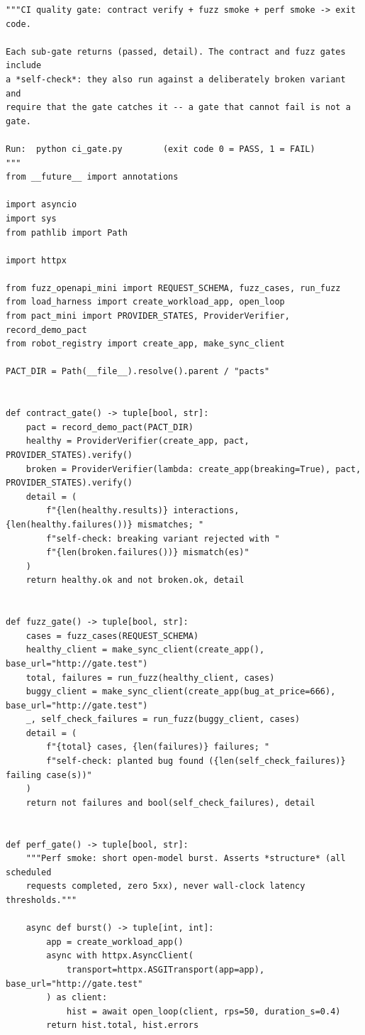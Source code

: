 \begin{verbatim}
"""CI quality gate: contract verify + fuzz smoke + perf smoke -> exit code.

Each sub-gate returns (passed, detail). The contract and fuzz gates include
a *self-check*: they also run against a deliberately broken variant and
require that the gate catches it -- a gate that cannot fail is not a gate.

Run:  python ci_gate.py        (exit code 0 = PASS, 1 = FAIL)
"""
from __future__ import annotations

import asyncio
import sys
from pathlib import Path

import httpx

from fuzz_openapi_mini import REQUEST_SCHEMA, fuzz_cases, run_fuzz
from load_harness import create_workload_app, open_loop
from pact_mini import PROVIDER_STATES, ProviderVerifier, record_demo_pact
from robot_registry import create_app, make_sync_client

PACT_DIR = Path(__file__).resolve().parent / "pacts"


def contract_gate() -> tuple[bool, str]:
    pact = record_demo_pact(PACT_DIR)
    healthy = ProviderVerifier(create_app, pact, PROVIDER_STATES).verify()
    broken = ProviderVerifier(lambda: create_app(breaking=True), pact, PROVIDER_STATES).verify()
    detail = (
        f"{len(healthy.results)} interactions, {len(healthy.failures())} mismatches; "
        f"self-check: breaking variant rejected with "
        f"{len(broken.failures())} mismatch(es)"
    )
    return healthy.ok and not broken.ok, detail


def fuzz_gate() -> tuple[bool, str]:
    cases = fuzz_cases(REQUEST_SCHEMA)
    healthy_client = make_sync_client(create_app(), base_url="http://gate.test")
    total, failures = run_fuzz(healthy_client, cases)
    buggy_client = make_sync_client(create_app(bug_at_price=666), base_url="http://gate.test")
    _, self_check_failures = run_fuzz(buggy_client, cases)
    detail = (
        f"{total} cases, {len(failures)} failures; "
        f"self-check: planted bug found ({len(self_check_failures)} failing case(s))"
    )
    return not failures and bool(self_check_failures), detail


def perf_gate() -> tuple[bool, str]:
    """Perf smoke: short open-model burst. Asserts *structure* (all scheduled
    requests completed, zero 5xx), never wall-clock latency thresholds."""

    async def burst() -> tuple[int, int]:
        app = create_workload_app()
        async with httpx.AsyncClient(
            transport=httpx.ASGITransport(app=app), base_url="http://gate.test"
        ) as client:
            hist = await open_loop(client, rps=50, duration_s=0.4)
        return hist.total, hist.errors


\end{verbatim}
